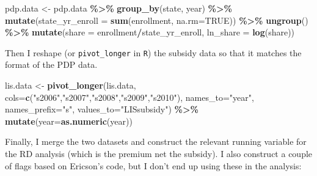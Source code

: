\documentclass[
  12pt,
]{article}
\newenvironment{Shaded}{\begin{snugshade}}{\end{snugshade}}
\newcommand{\DataTypeTok}[1]{\textcolor[rgb]{0.13,0.29,0.53}{#1}}
\newcommand{\KeywordTok}[1]{\textcolor[rgb]{0.13,0.29,0.53}{\textbf{#1}}}
\newcommand{\NormalTok}[1]{#1}
\newcommand{\OperatorTok}[1]{\textcolor[rgb]{0.81,0.36,0.00}{\textbf{#1}}}
\newcommand{\OtherTok}[1]{\textcolor[rgb]{0.56,0.35,0.01}{#1}}
\newcommand{\StringTok}[1]{\textcolor[rgb]{0.31,0.60,0.02}{#1}}
\begin{document}
\begin{Shaded}
\begin{Highlighting}[]
\NormalTok{pdp.data \textless{}{-}}\StringTok{ }\NormalTok{pdp.data }\OperatorTok{\%\textgreater{}\%}
\StringTok{  }\KeywordTok{group\_by}\NormalTok{(state, year) }\OperatorTok{\%\textgreater{}\%}
\StringTok{  }\KeywordTok{mutate}\NormalTok{(}\DataTypeTok{state\_yr\_enroll =} \KeywordTok{sum}\NormalTok{(enrollment, }\DataTypeTok{na.rm=}\OtherTok{TRUE}\NormalTok{)) }\OperatorTok{\%\textgreater{}\%}
\StringTok{  }\KeywordTok{ungroup}\NormalTok{() }\OperatorTok{\%\textgreater{}\%}
\StringTok{  }\KeywordTok{mutate}\NormalTok{(}\DataTypeTok{share =}\NormalTok{ enrollment}\OperatorTok{/}\NormalTok{state\_yr\_enroll,}
         \DataTypeTok{ln\_share =} \KeywordTok{log}\NormalTok{(share))}
\end{Highlighting}
\end{Shaded}


Then I reshape (or \texttt{pivot\_longer} in \texttt{R}) the subsidy data so that it matches the format of the PDP data.


\begin{Shaded}
\begin{Highlighting}[]
\NormalTok{lis.data \textless{}{-}}\StringTok{ }\KeywordTok{pivot\_longer}\NormalTok{(lis.data, }\DataTypeTok{cols=}\KeywordTok{c}\NormalTok{(}\StringTok{"s2006"}\NormalTok{,}\StringTok{"s2007"}\NormalTok{,}\StringTok{"s2008"}\NormalTok{,}\StringTok{"s2009"}\NormalTok{,}\StringTok{"s2010"}\NormalTok{), }
                         \DataTypeTok{names\_to=}\StringTok{"year"}\NormalTok{,}
                         \DataTypeTok{names\_prefix=}\StringTok{"s"}\NormalTok{,}
                         \DataTypeTok{values\_to=}\StringTok{"LISsubsidy"}\NormalTok{) }\OperatorTok{\%\textgreater{}\%}
\StringTok{  }\KeywordTok{mutate}\NormalTok{(}\DataTypeTok{year=}\KeywordTok{as.numeric}\NormalTok{(year))}
\end{Highlighting}
\end{Shaded}


Finally, I merge the two datasets and construct the relevant running variable for the RD analysis (which is the premium net the subsidy). I also construct a couple of flags based on Ericson's code, but I don't end up using these in the analysis:

\end{document}

